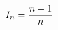 \documentclass[preview]{standalone}
\begin{document}
\begin{align*}
I_n = {n-1 \over n}
\end{align*}
\end{document}
